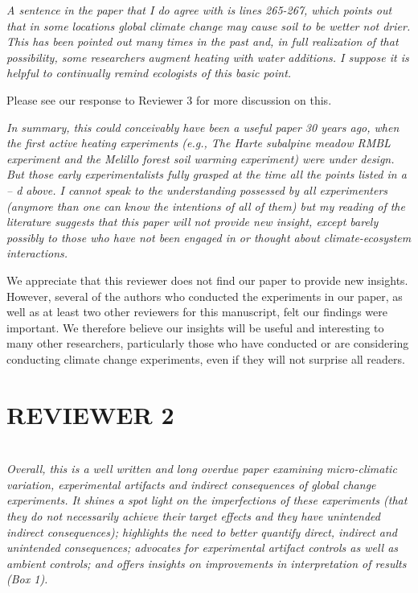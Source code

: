 \documentclass[11pt,a4paper]{letter}
\begin{document}
\begin{letter}{}
\emph{A sentence in the paper that I do agree with is lines 265-267, which points out that in some locations global climate change may cause soil to be wetter not drier.  This has been pointed out many times in the past and, in full realization of that possibility, some researchers augment heating with water additions.  I suppose it is helpful to continually remind ecologists of this basic point.}
\par Please see our response to Reviewer 3 for more discussion on this.

\emph{In summary, this could conceivably have been a useful paper 30 years ago, when the first active heating experiments (e.g., The Harte subalpine meadow RMBL experiment and the Melillo forest soil warming experiment) were under design.  But those early experimentalists fully grasped at the time all the points listed in a -- d above.  I cannot speak to the understanding possessed by all experimenters (anymore than one can know the intentions of all of them) but my reading of the literature suggests that this paper will not provide new insight, except barely possibly to those who have not been engaged in or thought about climate-ecosystem interactions.} 
\par We appreciate that this reviewer does not find our paper to provide new insights. However, several of the authors who conducted the experiments in our paper, as well as at least two other reviewers for this manuscript, felt our findings were important. We therefore believe our insights will be useful and interesting to many other researchers, particularly  those who have conducted or are considering conducting climate change experiments, even if they will not surprise all readers.

\section {REVIEWER 2}\\
\emph{Overall, this is a well written and long overdue paper examining micro-climatic variation, experimental artifacts and indirect consequences of global change experiments.  It shines a spot light on the imperfections of these experiments (that they do not necessarily achieve their target effects and they have unintended indirect consequences); highlights the need to better quantify direct, indirect and unintended consequences; advocates for experimental artifact controls as well as ambient controls;  and offers insights on improvements in interpretation of results (Box 1).}


\end{letter}
\end{document}
